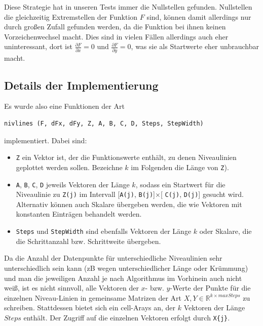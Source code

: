 \documentclass[a4paper,11pt,bibliography=totoc,listof=totoc,headinclude=true,cleardoublepage=empty,oneside]{scrartcl}
\newcommand{\R}{\mathbb{R}}
\newcommand{\diff}[2]{\frac{\partial #1}{\partial #2}}
\begin{document}
Diese Strategie hat in unseren Tests immer die Nullstellen gefunden. Nullstellen die gleichzeitig Extremstellen der Funktion $F$ sind, können damit allerdings nur durch großen Zufall gefunden werden, da die Funktion bei ihnen keinen Vorzeichenwechsel macht. Dies sind in vielen Fällen allerdings auch eher uninteressant, dort ist $\diff{F}{x}=0$ und $\diff{F}{y}=0$, was sie als Startwerte eher unbrauchbar macht. 

\subsection{Details der Implementierung}

Es wurde also eine Funktionen der Art
\begin{verbatim}
nivlines (F, dFx, dFy, Z, A, B, C, D, Steps, StepWidth)
\end{verbatim}
implementiert. Dabei sind:
\begin{itemize}
	\item \verb|Z| ein Vektor ist, der die Funktionswerte enthält, zu denen Niveaulinien geplottet werden sollen. Bezeichne $k$ im Folgenden die Länge von \verb|Z|).
	\item \verb|A|, \verb|B|, \verb|C|, \verb|D| jeweils Vektoren der Länge $k$, sodass ein Startwert für die Niveaulinie zu \verb|Z(j)| im Intervall [\verb|A(j)|, \verb|B(j)|]$\times$[ \verb|C(j)|, \verb|D(j)|] gesucht wird. Alternativ können auch Skalare übergeben werden, die wie Vektoren mit konstanten Einträgen behandelt werden.
	\item  \verb|Steps| und \verb|StepWidth| sind ebenfalls Vektoren der Länge $k$ oder Skalare, die die Schrittanzahl bzw. Schrittweite übergeben.
\end{itemize}


%


Da die Anzahl der Datenpunkte für unterschiedliche Niveaulinien sehr unterschiedlich sein kann (zB wegen unterschiedlicher Länge oder Krümmung) und man die jeweiligen Anzahl je nach Algorithmus im Vorhinein auch nicht weiß, ist es nicht sinnvoll, alle Vektoren der $x$- bzw. $y$-Werte der Punkte für die einzelnen Niveau-Linien in gemeinsame Matrizen der Art $X, Y \in \R^{k \times maxSteps}$ zu schreiben. Stattdessen bietet sich ein cell-Arays an, der $k$ Vektoren der Länge $Steps$ enthält. Der Zugriff auf die einzelnen Vektoren erfolgt durch \verb|X{j}|.
\end{document}
